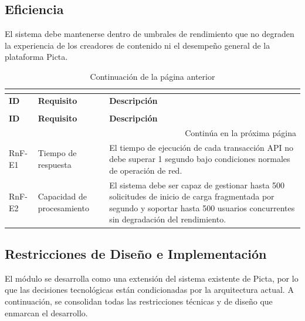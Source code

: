 \subsection{Eficiencia}

El sistema debe mantenerse dentro de umbrales de rendimiento que no degraden la experiencia de los
creadores de contenido ni el desempeño general de la plataforma Picta.

\begin{longtable}[c]{|p{1.8cm}|p{3cm}|p{8cm}|}
\caption{Requisitos de Eficiencia}
\label{tb:rnf_eficiencia}\\
\hline
\multicolumn{3}{|l|}{{\textbf{Eficiencia}}} \\
\hline
\textbf{ID} & \textbf{Requisito} & \textbf{Descripción} \\
\hline
\endfirsthead
\caption[]{Continuación de la página anterior} \\
\hline
\textbf{ID} & \textbf{Requisito} & \textbf{Descripción} \\
\hline
\endhead
\multicolumn{3}{r}{{Continúa en la próxima página}} \\
\endfoot
\hline
\endlastfoot

RnF-E1 & Tiempo de respuesta &
El tiempo de ejecución de cada transacción API no debe superar 1 segundo bajo condiciones normales de
operación de red. \\ \hline

RnF-E2 & Capacidad de procesamiento &
El sistema debe ser capaz de gestionar hasta 500 solicitudes de inicio de carga fragmentada por
segundo y soportar hasta 500 usuarios concurrentes sin degradación del rendimiento. \\ \hline

\end{longtable}

\subsection{Restricciones de Diseño e Implementación}

El módulo se desarrolla como una extensión del sistema existente de Picta, por lo que las decisiones
tecnológicas están condicionadas por la arquitectura actual. A continuación, se consolidan todas las
restricciones técnicas y de diseño que enmarcan el desarrollo.

